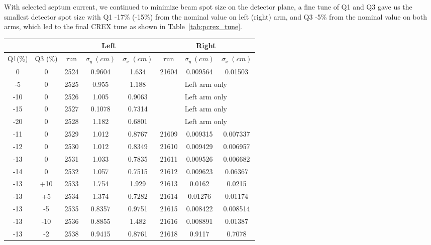 With selected septum current, we continued to minimize beam spot size on the detector
plane, a fine tune of Q1 and Q3 gave us the smallest detector spot size with
Q1 -17\% (-15\%) from the nominal value on left (right) arm, and Q3 -5\% from
the nominal value on both arms, which led to the final CREX tune as shown in
Table~\ref{tab:pcrex_tune}.
\begin{table}[h!]
    \begin{tabular}{c c | c c c | c c c}
	\hline
	& & \multicolumn{3}{c}{Left} & \multicolumn{3}{c}{Right}  \\
	\hline
	Q1(\%)  & Q3 (\%)    & run   & $\sigma_y\ (cm)$  & $\sigma_x\ (cm)$   & run   & $\sigma_y\ (cm)$    & $\sigma_x\ (cm)$    \\
	\hline
	0   & 0	    & 2524  & 0.9604	& 1.634	    & 21604	& 0.009564  & 0.01503 \\
	-5  & 0	    & 2525  & 0.955	& 1.188	    & \multicolumn{3}{c}{Left arm only}    \\
	-10 & 0	    & 2526  & 1.005	& 0.9063    & \multicolumn{3}{c}{Left arm only}    \\ 
	-15 & 0	    & 2527  & 0.1078	& 0.7314    & \multicolumn{3}{c}{Left arm only}    \\ 
	-20 & 0	    & 2528  & 1.182	& 0.6801    & \multicolumn{3}{c}{Left arm only}    \\ 
	\hline                              
	-11 & 0	    & 2529  & 1.012	& 0.8767    & 21609	& 0.009315  & 0.007337	\\
	-12 & 0	    & 2530  & 1.012	& 0.8349    & 21610	& 0.009429  & 0.006957  \\
	-13 & 0	    & 2531  & 1.033	& 0.7835    & 21611	& 0.009526  & 0.006682  \\
	-14 & 0	    & 2532  & 1.057	& 0.7515    & 21612	& 0.009623  & 0.06367   \\
	\hline                              
	-13 & +10   & 2533  & 1.754	& 1.929	    & 21613	& 0.0162    & 0.0215    \\
	-13 & +5    & 2534  & 1.374	& 0.7282    & 21614	& 0.01276   & 0.01174   \\
	-13 & -5    & 2535  & 0.8357	& 0.9751    & 21615	& 0.008422  & 0.008514  \\
	-13 & -10   & 2536  & 0.8855	& 1.482	    & 21616	& 0.008891  & 0.01387   \\
	\hline
	-13 & -2    & 2538  & 0.9415	& 0.8761    & 21618	& 0.9117    & 0.7078  \\

\end{tabular}
\end{table}
